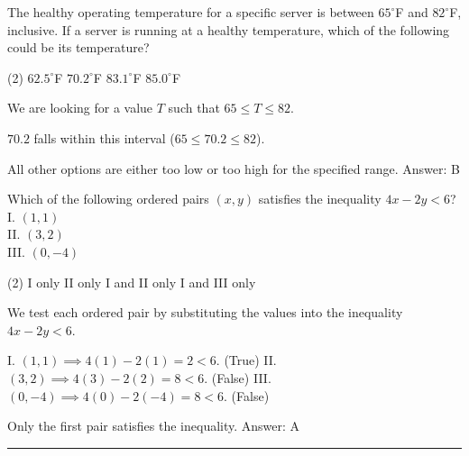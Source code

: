 \documentclass[11pt,paper=a4,answers]{exam}
\begin{document}
\begin{questions}
\vspace{1cm}

\question
The healthy operating temperature for a specific server is between $65^\circ$F and $82^\circ$F, inclusive. If a server is running at a healthy temperature, which of the following could be its temperature?
\begin{tasks}(2)
\task $62.5^\circ$F
\task $70.2^\circ$F
\task $83.1^\circ$F
\task $85.0^\circ$F
\end{tasks}

\begin{solution}
We are looking for a value $T$ such that $65 \leq T \leq 82$.
\vspace{5pt}
\begin{center}
$70.2$ falls within this interval ($65 \leq 70.2 \leq 82$).
\end{center}
\vspace{5pt}
All other options are either too low or too high for the specified range.
\vspace{5pt}
Answer: \colorbox{yellow!100}{B}
\end{solution}

\vspace{1cm}

\question
Which of the following ordered pairs $(x, y)$ satisfies the inequality $4x - 2y < 6$? \\
I. $(1, 1)$ \\
II. $(3, 2)$ \\
III. $(0, -4)$
\begin{tasks}(2)
\task I only
\task II only
\task I and II only
\task I and III only
\end{tasks}

\begin{solution}
We test each ordered pair by substituting the values into the inequality $4x - 2y < 6$.
\vspace{5pt}
\begin{center}
I. $(1, 1) \implies 4(1) - 2(1) = 2 < 6$. (True)
\vspace{5pt}
II. $(3, 2) \implies 4(3) - 2(2) = 8 < 6$. (False)
\vspace{5pt}
III. $(0, -4) \implies 4(0) - 2(-4) = 8 < 6$. (False)
\end{center}
\vspace{5pt}
Only the first pair satisfies the inequality.
\vspace{5pt}
Answer: \colorbox{yellow!100}{A}
\end{solution}


\end{questions}
\begin{center}
\rule{.5\textwidth}{1pt}
\end{center}
\end{document}
